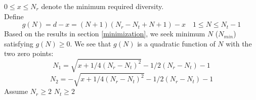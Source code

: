 \documentclass[12pt,a4paper,final]{article}
\begin{document}
\begin{spacing}{2.5}
 $0\leq x\leq N_{r}$ denote the minimum required diversity.\\
Define
\begin{equation}
g(N)=d-x=(N+1)(N_{r}-N_{t}+N+1)-x\label{equation17}\quad 1\leq N\leq N_{t}-1
\end{equation}
Based on the results in section \ref{minimization}, we seek minimum $N$ ($N_{min}$) satisfying $g(N)\geq 0$. We see that $g(N)$ is a quadratic function of $N$ with the two zero points:
\begin{equation}
N_{1}=\sqrt{x+1/4(N_{r}-N_{t})^2}-1/2(N_{r}-N_{t})-1\label{equation18}
\end{equation}
 \begin{equation}
N_{2}=-\sqrt{x+1/4(N_{r}-N_{t})^2}-1/2(N_{r}-N_{t})-1\label{equation19}
\end{equation} 
Assume $N_{r}\geq 2$ $N_{t}\geq 2$


\end{spacing}
\end{document}
